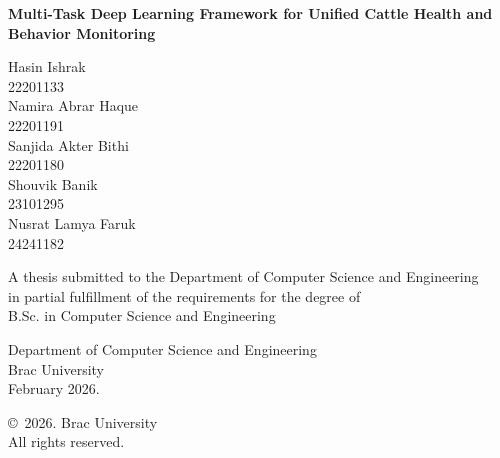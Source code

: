 \begin{titlepage}
\renewcommand*{\thepage}{Title}

    \begin{center} 
        \vspace*{2cm}
        
        {\fontsize{16pt}{22pt}\selectfont{Pre-Thesis I Report}
        }
        
        \vspace{0.8cm}
        
        {\fontsize{14pt}{20pt}\selectfont\textbf{Multi-Task Deep Learning Framework for Unified Cattle Health and Behavior Monitoring}
        }
        
        \vspace{0.6cm}
        
        \vspace{0.6cm}
        
        Hasin Ishrak\\
        22201133\\
        \vspace{0.1cm}
        Namira Abrar Haque\\
        22201191\\
        \vspace{0.1cm}
        Sanjida Akter Bithi\\
        22201180\\
        \vspace{0.1cm}
        Shouvik Banik\\
        23101295\\
        \vspace{0.1cm}
        Nusrat Lamya Faruk\\
        24241182

        \vspace{1cm}
        
        A thesis submitted to the Department of Computer Science and Engineering\\
        in partial fulfillment of the requirements for the degree of\\
        B.Sc. in Computer Science and Engineering

        
        \vspace{1cm}
        
        Department of Computer Science and Engineering\\
        Brac University\\
        February 2026.
        
        \vspace{1cm}
        
        \copyright\ 2026. Brac University\\
        All rights reserved.
    
    \end{center}

\end{titlepage}
